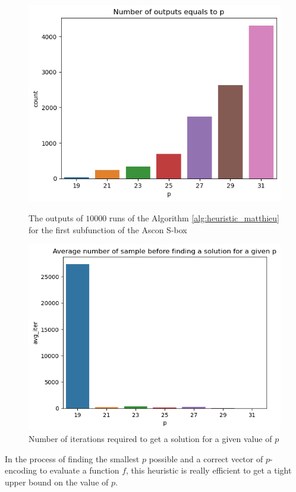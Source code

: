 \begin{figure}
  \begin{minipage}{0.48\linewidth}
    \    \centering
    \includegraphics[width=\linewidth]{img/p_encodings/heuristic_ascon_0_p_frequencies.png}
    \caption{The outputs of $10000$ runs of the Algorithm \ref{alg:heuristic_matthieu} for the first subfunction of the Ascon \gls{S-box}}
    \label{fig:ascon_0_p_frequencies}
  \end{minipage} \hfill
  \begin{minipage}{0.48\linewidth}
    \centering
    \includegraphics[width=\linewidth]{img/p_encodings/heuristric_ascon_0_count_iter.png}
    \caption{Number of iterations required to get a solution for a given value of $p$}
    \label{fig:ascon_0_count_iter}
  \end{minipage}
\end{figure}


In the process of finding the smallest $p$ possible and a correct vector of $p$-encoding to evaluate a function $f$, this heuristic is really efficient to get a tight upper bound on the value of $p$.

